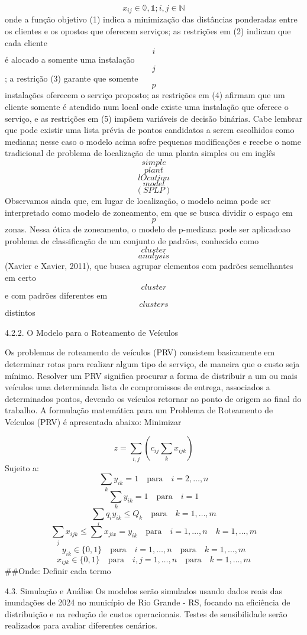 \documentclass[
]{article}
\begin{document}
\[
x_{ij} \in \mathbb{0,1}; i,j \in \mathbb{N}
\] onde a função objetivo (1) indica a minimização das distâncias
ponderadas entre os clientes e os opostos que oferecem serviços; as
restrições em (2) indicam que cada cliente \[i\] é alocado a somente uma
instalação \[j\] ; a restrição (3) garante que somente \[
p
\] instalações oferecem o serviço proposto; as restrições em (4) afirmam
que um cliente somente é atendido num local onde existe uma instalação
que oferece o serviço, e as restrições em (5) impõem variáveis de
decisão binárias. Cabe lembrar que pode existir uma lista prévia de
pontos candidatos a serem escolhidos como mediana; nesse caso o modelo
acima sofre pequenas modificações e recebe o nome tradicional de
problema de localização de uma planta simples ou em inglês \[ simple \]
\[ plant \] \[ lOcation \] \[ model \] \[(SPLP)\] Observamos ainda que,
em lugar de localização, o modelo acima pode ser interpretado como
modelo de zoneamento, em que se busca dividir o espaço em \[
p\] zonas. Nessa ótica de zoneamento, o modelo de p-mediana pode ser
aplicadoao problema de classificação de um conjunto de padrões,
conhecido como \[cluster\] \[analysis\] (Xavier e Xavier, 2011), que
busca agrupar elementos com padrões semelhantes em certo \[ cluster \] e
com padrões diferentes em \[ clusters \] distintos

4.2.2. O Modelo para o Roteamento de Veículos

Os problemas de roteamento de veículos (PRV) consistem basicamente em
determinar rotas para realizar algum tipo de serviço, de maneira que o
custo seja mínimo. Resolver um PRV significa procurar a forma de
distribuir a um ou mais veículos uma determinada lista de compromissos
de entrega, associados a determinados pontos, devendo os veículos
retornar ao ponto de origem ao final do trabalho. A formulação
matemática para um Problema de Roteamento de Veículos (PRV) é
apresentada abaixo: Minimizar

\[
z=\sum_{i,j}(c_{ij}\sum_{k}x_{ijk})
\] Sujeito a: \[
\sum_{k}y_{ik}=1 \quad \text{para} \quad  i=2, \dots,n
\] \[
\sum_{k}y_{ik}=1\quad \text{para} \quad  i=1
\] \[
\sum_{i}q_{i}y_{ik} \leq Q_{k} \quad \text{para} \quad  k=1, \dots,m
\] \[
\sum_{j}x_{ijk} \leq\sum x_{jix}=y_{ik} \quad \text{para}\quad i=1,\dots,n\quad k=1,\dots,m
\] \[
y_{ik} \in \{0,1\}\quad\text{para}\quad i=1,\dots,n\quad\text{para}\quad k=1,\dots,m
\] \[
x_{ijk} \in \{0,1\}\quad\text{para}\quad i,j=1,\dots,n\quad\text{para}\quad k=1,\dots,m
\] \#\#Onde: Definir cada termo

4.3. Simulação e Análise Os modelos serão simulados usando dados reais
das inundações de 2024 no município de Rio Grande - RS, focando na
eficiência de distribuição e na redução de custos operacionais. Testes
de sensibilidade serão realizados para avaliar diferentes cenários.
\end{document}
